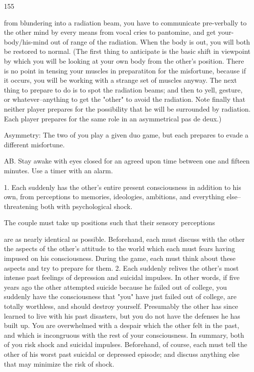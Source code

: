 \documentclass[10pt,twoside]{memoir}
\begin{document}
\begin{enumerate}
{\begin{enumerate}
\begin{sysrules}
\begin{sysrules}
\begin{sysrules}
\begin{sysrules}
{\begin{enumerate}
{{{{{{155 


from blundering into a radiation beam, you have to communicate 
pre-verbally to the other mind by every means from vocal cries to 
pantomine, and get your-body/his-mind out of range of the radiation. When 
the body is out, you will both be restored to normal. (The first thing to 
anticipate is the basic shift in viewpoint by which you will be looking at 
your own body from the other's position. There is no point in tensing your 
muscles in preparatiton for the misfortune, because if it occurs, you will be 
working with a strange set of muscles anyway. The next thing to prepare to 
do is to spot the radiation beams; and then to yell, gesture, or 
whatever--anything to get the "other" to avoid the radiation. Note finally 
that neither player prepares for the possibility that he will be surrounded by 
radiation. Each player prepares for the same role in an asymmetrical pas de 
deux.) 

Asymmetry: The two of you play a given duo game, but each prepares 
to evade a different misfortune. 

AB. Stay awake with eyes closed for an agreed upon time between one 
and fifteen minutes. Use a timer with an alarm. 

1. Each suddenly has the other's entire present consciousness in addition to 
his own, from perceptions to memories, ideologies, ambitions, and 
everything else--threatening both with psychological shock. 

The couple must take up positions such that their sensory perceptions 

are as nearly identical as possible. Beforehand, each must discuss with the 
other the aspects of the other's attitude to the world which each must fears 
having impused on his consciousness. During the game, each must think 
about these aspects and try to prepare for them. 
2. Each suddenly relives the other's most intense past feelings of depression 
and suicidal impulses. In other words, if five years ago the other attempted 
suicide because he failed out of college, you suddenly have the consciousness 
that "you" have just failed out of college, are totally worthless, and should 
destroy yourself. Presumably the other has since learned to live with his past 
disasters, but you do not have the defenses he has built up. You are 
overwhelmed with a despair which the other felt in the past, and which is 
incongruous with the rest of your consciousness. In summary, both of you 
risk shock and suicidal impulses. Beforehand, of course, each must tell the 
other of his worst past suicidal or depressed episode; and discuss anything 
else that may minimize the risk of shock. 


}}}}}}
\end{enumerate}}
\end{sysrules}
\end{sysrules}
\end{sysrules}
\end{sysrules}
\end{enumerate}}
\end{enumerate}
\end{document}
